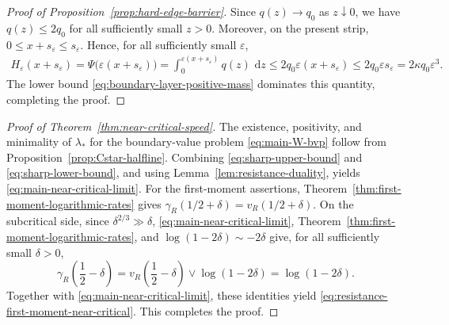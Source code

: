 \documentclass[12pt,preprint]{amsart}
\numberwithin{equation}{section}
\theoremstyle{plain}
\theoremstyle{definition}
\newcommand{\dd}{\,\mathrm d}
\begin{document}
\begin{proof}[Proof of Proposition~\ref{prop:hard-edge-barrier}]
Since $q(z)\to q_0$ as $z\downarrow0$, we have
$q(z)\le2q_0$ for all sufficiently small $z>0$.  Moreover, on the
present strip, $0\le x+s_\varepsilon\le s_\varepsilon$.  Hence, for all
sufficiently small $\varepsilon$,
\[
\begin{aligned}
 H_\varepsilon(x+s_\varepsilon)
 =\Psi\bigl(\varepsilon(x+s_\varepsilon)\bigr)
 =\int_0^{\varepsilon(x+s_\varepsilon)}q(z)\,\dd z
 \le2q_0\varepsilon(x+s_\varepsilon)
 \le2q_0\varepsilon s_\varepsilon
 =2\kappa q_0\varepsilon^3.
\end{aligned}
\]
  The lower bound
\eqref{eq:boundary-layer-positive-mass} dominates this quantity, completing
the proof.
\end{proof}


\begin{proof}[Proof of Theorem~\ref{thm:near-critical-speed}]
The existence, positivity, and minimality of $\lambda_*$ for the
boundary-value problem \eqref{eq:main-W-bvp} follow from
Proposition~\ref{prop:Cstar-halfline}.
  Combining \eqref{eq:sharp-upper-bound} and
\eqref{eq:sharp-lower-bound}, and using
Lemma~\ref{lem:resistance-duality}, yields
\eqref{eq:main-near-critical-limit}.
For the first-moment assertions, Theorem~\ref{thm:first-moment-logarithmic-rates}
gives
$\gamma_R(1/2+\delta)=v_R(1/2+\delta)$.  On the subcritical side, since
$\delta^{2/3}\gg\delta$, \eqref{eq:main-near-critical-limit},
Theorem~\ref{thm:first-moment-logarithmic-rates}, and
$\log(1-2\delta)\sim-2\delta$ give, for all sufficiently small $\delta>0$,
\[
 \gamma_R\left(\frac12-\delta\right)
 =v_R\left(\frac12-\delta\right)\vee\log(1-2\delta)
 =\log(1-2\delta).
\]
Together with \eqref{eq:main-near-critical-limit}, these identities yield
\eqref{eq:resistance-first-moment-near-critical}.  This completes the proof.
\end{proof}
\end{document}
